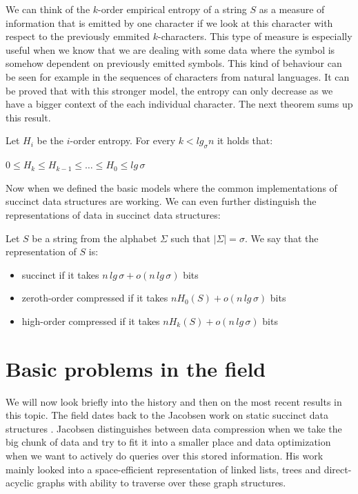 We can think of the $k$-order empirical entropy of a string $S$ as a measure of information that is emitted by one character if we look at this character with respect to the previously emmited $k$-characters. This type of measure is especially useful when we know that we are dealing with some data where the symbol is somehow dependent on previously emitted symbols. This kind of behaviour can be seen for example in the sequences of characters from natural languages. It can be proved that with this stronger model, the entropy can only decrease as we have a bigger context of the each individual character. The next theorem sums up this result.

\begin{theorem}
Let $H_i$ be the $i$-order entropy. For every $k<lg_{\sigma}n$ it holds that:
\begin{center}
$0\leq H_{k}\leq H_{k-1}\leq \ldots\leq H_0 \leq lg\, \sigma$
\end{center}
\end{theorem}

Now when we defined the basic models where the common implementations of succinct data structures are working. We can even further distinguish the representations of data in succinct data structures:

\begin{theorem}
Let $S$ be a string from the alphabet $\Sigma$ such that $|\Sigma|=\sigma$. We say that the representation of $S$ is:
\begin{itemize}
    \item succinct if it takes $n\,lg\,\sigma + o(n\,lg\,\sigma)$ bits
    \item zeroth-order compressed if it takes $nH_0(S) + o(n\,lg\,\sigma)$ bits
    \item high-order compressed if it takes $nH_k(S) + o(n\,lg\,\sigma)$ bits
\end{itemize}
\end{theorem}

\section{Basic problems in the field}

We will now look briefly into the history and then on the most recent results in this topic. The field dates back to the Jacobsen work on static succinct data structures \cite{jacobson1988succinct}. Jacobsen distinguishes between data compression when we take the big chunk of data and try to fit it into a smaller place and
data optimization when we want to actively do queries over this stored information. His work mainly looked into a space-efficient representation of linked lists, trees and direct-acyclic graphs with ability to traverse over these graph structures.

